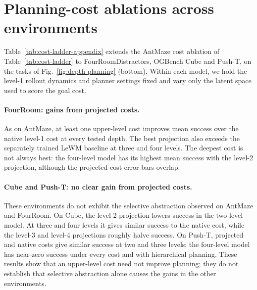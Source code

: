 \section{Planning-cost ablations across environments}
\label{sec:negative-control}

Table~\ref{tab:cost-ladder-appendix} extends the AntMaze cost ablation of
Table~\ref{tab:cost-ladder} to FourRoomDistractors, OGBench Cube and Push-T,
on the tasks of Fig.~\ref{fig:depth-planning} (bottom). Within each model,
we hold the level-1 rollout dynamics and planner settings fixed and vary only
the latent space used to score the goal cost.

\paragraph{FourRoom: gains from projected costs.}
As on AntMaze, at least one upper-level cost improves mean success over the
native level-1 cost at every tested depth. The best projection also exceeds
the separately trained LeWM baseline at three and four levels.
The deepest cost is not always best: the four-level model has its highest
mean success with the level-2 projection, although the projected-cost error
bars overlap.

\paragraph{Cube and Push-T: no clear gain from projected costs.}
These environments do not exhibit the selective abstraction observed on
AntMaze and FourRoom. On Cube, the level-2 projection lowers success in the
two-level model. At three and four levels it gives similar success to the native
cost, while the level-3 and level-4 projections roughly halve success.
On Push-T, projected and native costs give similar success at two and three
levels; the four-level model has near-zero success under every cost and with
hierarchical planning. These results show that an upper-level cost need not
improve planning; they do not establish that selective abstraction alone
causes the gains in the other environments.

